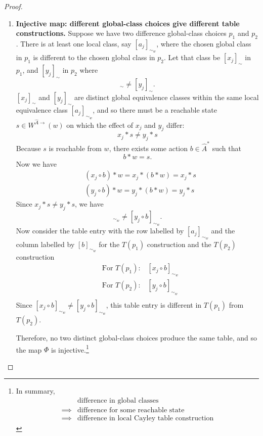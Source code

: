 \begin{proof}
\begin{enumerate}[(1)]
    \item \textbf{Injective map: different global-class choices give different table constructions.}
    Suppose we have two difference global-class choices $p_{1}$ and $p_{2}$.
    There is at least one local class, say $[a_{j}]_{\sim_{w}}$, where the chosen global class in $p_{1}$ is different to the chosen global class in $p_{2}$.
    Let that class be $[x_{j}]_{\sim}$ in $p_{1}$, and $[y_{j}]_{\sim}$ in $p_{2}$ where
    \begin{equation}
        [x_{j}]_{\sim} \neq [y_{j}]_{\sim}.
    \end{equation}
    $[x_{j}]_{\sim}$ and $[y_{j}]_{\sim}$ are distinct global equivalence classes within the same local equivalence class $[a_{j}]_{\sim_{w}}$, and so there must be a reachable state $s \in W^{\hat{A}\to}(w)$ on which the effect of $x_{j}$ and $y_{j}$ differ:
    \begin{equation}
        x_{j} \ast s \neq y_{j} \ast s
    \end{equation}
    Because $s$ is reachable from $w$, there exists some action $b \in \hat{A}^{*}$ such that
    \begin{equation}
        b \ast w = s.
    \end{equation}
    Now we have
    \begin{align}
        & (x_{j} \circ b) \ast w = x_{j} \ast (b \ast w) = x_{j} \ast s \\
        & (y_{j} \circ b) \ast w = y_{j} \ast (b \ast w) = y_{j} \ast s
    \end{align}
    Since $x_{j} \ast s \neq y_{j} \ast s$, we have
    \begin{equation}
        [x_{j} \circ b]_{\sim_{w}} \neq [y_{j} \circ b]_{\sim_{w}} .
    \end{equation}
    Now consider the table entry with the row labelled by $[a_{j}]_{\sim_{w}}$ and the column labelled by $[b]_{\sim_{w}}$ for the $T(p_{1})$ construction and the $T(p_{2})$ construction
    \begin{align}
        & \text{For $T(p_{1})$:} \quad [x_{j} \circ b]_{\sim_{w}} \\
        & \text{For $T(p_{2})$:} \quad [y_{j} \circ b]_{\sim_{w}} \\
    \end{align}
    Since $[x_{j} \circ b]_{\sim_{w}} \neq [y_{j} \circ b]_{\sim_{w}}$, this table entry is different in $T(p_{1})$ from $T(p_{2})$.
    
    Therefore, no two distinct global-class choices produce the same table, and so the map $\Phi$ is injective.\footnote{
    In summary,
    \begin{equation}
    \begin{aligned}
        & \text{difference in global classes} \\
        \implies & \text{difference for some reachable state} \\
        \implies & \text{difference in local Cayley table construction}
    \end{aligned}
    \end{equation}
    }


\end{enumerate}
\end{proof}
